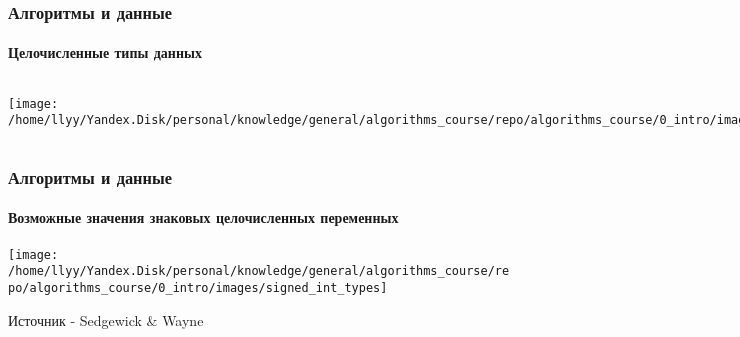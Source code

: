 \documentclass[aspectratio=169]{beamer}
\begin{document}
\begin{frame}
\frametitle{Алгоритмы и данные}
\framesubtitle{Целочисленные типы данных}
\justifying
\begin{block}{}
\begin{columns}[]
\column{\dimexpr\linewidth-60mm}
\justifying
\small

\centering
\texttt{[image: /home/llyy/Yandex.Disk/personal/knowledge/general/algorithms\_course/repo/algorithms\_course/0\_intro/images/signed\_all\_table]}
\centering

\column{60mm}

\texttt{[image: /home/llyy/Yandex.Disk/personal/knowledge/general/algorithms\_course/repo/algorithms\_course/0\_intro/images/signed\_16bit\_example]}
\centering

\end{columns}
\end{block}
\end{frame}

\begin{frame}
\frametitle{Алгоритмы и данные}
\framesubtitle{Возможные значения знаковых целочисленных переменных}
\justifying
\small
\centering
\texttt{[image: /home/llyy/Yandex.Disk/personal/knowledge/general/algorithms\_course/repo/algorithms\_course/0\_intro/images/signed\_int\_types]}

\tiny Источник - Sedgewick \& Wayne 
\end{frame}
\end{document}
